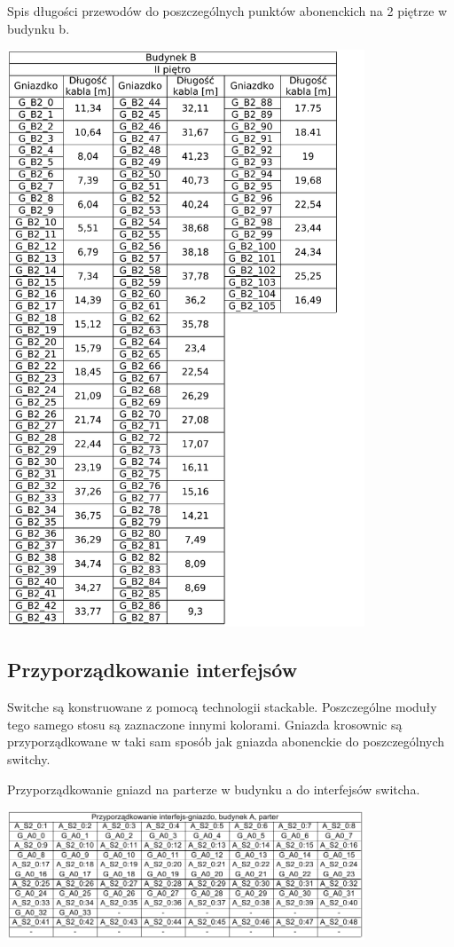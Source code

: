 \documentclass{report}
\begin{document}
\begin{table}[H]
\caption{Spis długości przewodów do poszczególnych punktów abonenckich na 2 piętrze w budynku b.}
 \centering
      \includegraphics[width=0.8\textwidth]{./obrazki/dl_kable/b2.png}
\end{table}

\subsection{Przyporządkowanie interfejsów}

Switche są konstruowane z pomocą technologii stackable. Poszczególne moduły tego samego stosu są zaznaczone innymi kolorami.
Gniazda krosownic są przyporządkowane w taki sam sposób jak gniazda abonenckie do poszczególnych switchy.

\begin{table}[H]
\caption{Przyporządkowanie gniazd na parterze w budynku a do interfejsów switcha.}
 \centering
      \includegraphics[width=0.8\textwidth]{./obrazki/tab_kros/a0.png}
\end{table}
\end{document}
